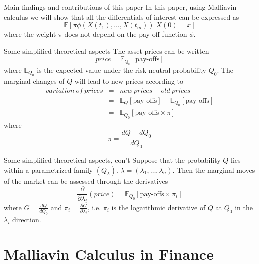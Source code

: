 \documentclass{beamer}
\begin{document}
\begin{frame}{Main findings and contributions of this paper}
  In this paper, using Malliavin calculus we will show that all the differentials
of interest can be expressed as
  $$
  \mathbb{E}[\pi \phi(X(t_1),\ldots,X(t_m)) | X(0) = x]
  $$
  where the weight $\pi$ does not depend on the pay-off function $\phi$.
\end{frame}


\begin{frame}{Some simplified theoretical aspects}
  The asset prices can be written
  $$
  price = \mathbb{E}_{Q_0}[\textrm{pay-offs}]
  $$
  where $\mathbb{E}_{Q_0}$ is the expected value under the risk neutral probability $Q_0$. The marginal changes of $Q$ will lead to new prices according to
  \begin{eqnarray*}
  variation~of~prices &=& new~prices - old~prices \\
  					  &=& \mathbb{E}_{Q}[\textrm{pay-offs}] -\mathbb{E}_{Q_0}[\textrm{pay-offs}] \\
                      &=& \mathbb{E}_{Q_0}[\textrm{pay-offs} \times \pi]
  \end{eqnarray*}
  where
  $$
  \pi = \frac{dQ-dQ_0}{dQ_0}
  $$
\end{frame}


\begin{frame}{Some simplified theoretical aspects, con't}
  Suppose that the probability $Q$ lies within a parametrized family $(Q_\lambda)$. $\lambda = (\lambda_1,\ldots,\lambda_n)$. Then the marginal moves of the market can be assessed
through the derivatives
  $$
  \frac{\partial}{\partial \lambda_i} (price) = \mathbb{E}_{Q_0}[\textrm{pay-offs} \times \pi_i]
  $$
  where $G = \frac{dQ}{dQ_0}$ and $\pi_i=\frac{\partial G}{\partial \lambda_i}$, i.e. $\pi_i$ is the logarithmic derivative of $Q$ at $Q_0$ in the $\lambda_i$ direction.
\end{frame}


\section{Malliavin Calculus in Finance}
\end{document}
